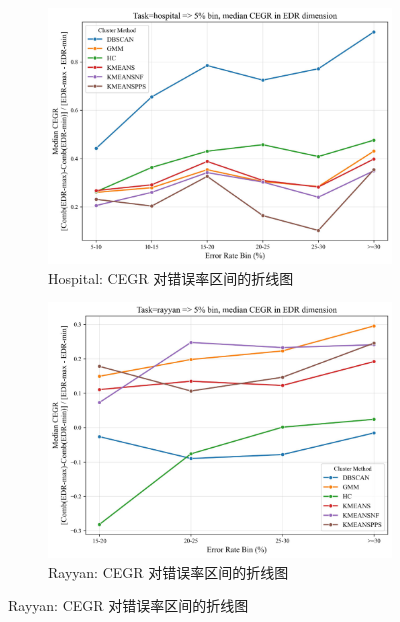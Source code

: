\documentclass[10pt]{article} %
\numberwithin{equation}{section}
\begin{document}
\begin{enumerate}[label=(\alph*)]
\begin{figure}[htbp]
    \vspace{1em} %

    \begin{subfigure}[b]{0.45\linewidth}
        \centering
        \includegraphics[width=\linewidth]{figures/line graph/CEGR_5pct_hospital.pdf}
        \caption{Hospital: CEGR 对错误率区间的折线图}
        \label{fig:cegr_hospital}
    \end{subfigure}
    \hfill
    \begin{subfigure}[b]{0.45\linewidth}
        \centering
        \includegraphics[width=\linewidth]{figures/line graph/CEGR_5pct_rayyan.pdf}
        \caption{Rayyan: CEGR 对错误率区间的折线图}
        \label{fig:cegr_rayyan}
    \end{subfigure}


\end{figure}
\end{enumerate}
\end{document}
